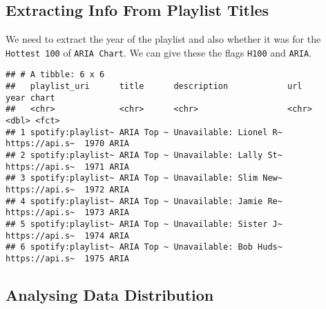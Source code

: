 \documentclass[
]{article}
\newenvironment{Shaded}{\begin{snugshade}}{\end{snugshade}}
\newcommand{\CharTok}[1]{\textcolor[rgb]{0.31,0.60,0.02}{#1}}
\newcommand{\DataTypeTok}[1]{\textcolor[rgb]{0.13,0.29,0.53}{#1}}
\newcommand{\KeywordTok}[1]{\textcolor[rgb]{0.13,0.29,0.53}{\textbf{#1}}}
\newcommand{\NormalTok}[1]{#1}
\newcommand{\OperatorTok}[1]{\textcolor[rgb]{0.81,0.36,0.00}{\textbf{#1}}}
\newcommand{\OtherTok}[1]{\textcolor[rgb]{0.56,0.35,0.01}{#1}}
\newcommand{\StringTok}[1]{\textcolor[rgb]{0.31,0.60,0.02}{#1}}
\begin{document}
\hypertarget{extracting-info-from-playlist-titles}{%
\subsection{Extracting Info From Playlist
Titles}\label{extracting-info-from-playlist-titles}}

We need to extract the year of the playlist and also whether it was for
the \texttt{Hottest\ 100} of \texttt{ARIA\ Chart}. We can give these the
flags \texttt{H100} and \texttt{ARIA}.

\begin{Shaded}
\end{Shaded}

\begin{verbatim}
## # A tibble: 6 x 6
##   playlist_uri      title      description            url             year chart
##   <chr>             <chr>      <chr>                  <chr>          <dbl> <fct>
## 1 spotify:playlist~ ARIA Top ~ Unavailable: Lionel R~ https://api.s~  1970 ARIA 
## 2 spotify:playlist~ ARIA Top ~ Unavailable: Lally St~ https://api.s~  1971 ARIA 
## 3 spotify:playlist~ ARIA Top ~ Unavailable: Slim New~ https://api.s~  1972 ARIA 
## 4 spotify:playlist~ ARIA Top ~ Unavailable: Jamie Re~ https://api.s~  1973 ARIA 
## 5 spotify:playlist~ ARIA Top ~ Unavailable: Sister J~ https://api.s~  1974 ARIA 
## 6 spotify:playlist~ ARIA Top ~ Unavailable: Bob Huds~ https://api.s~  1975 ARIA
\end{verbatim}

\hypertarget{analysing-data-distribution}{%
\subsection{Analysing Data
Distribution}\label{analysing-data-distribution}}
\end{document}
